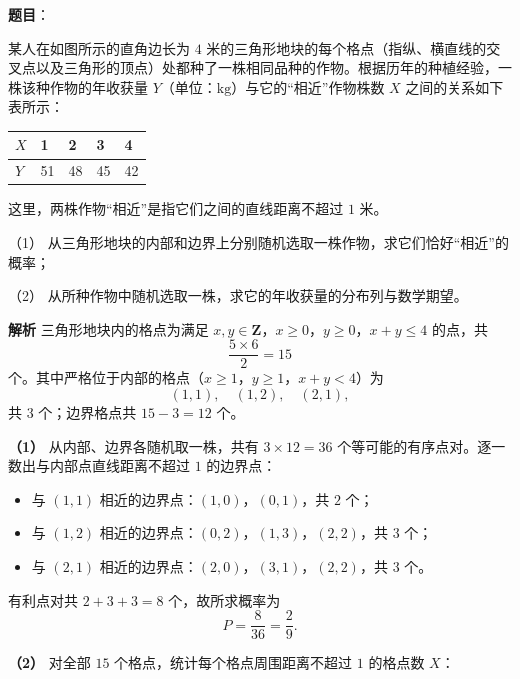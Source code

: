 \begin{answer}

\textbf{题目}：

某人在如图所示的直角边长为 $4$ 米的三角形地块的每个格点（指纵、横直线的交叉点以及三角形的顶点）处都种了一株相同品种的作物。根据历年的种植经验，一株该种作物的年收获量 $Y$（单位：$\mathrm{kg}$）与它的“相近”作物株数 $X$ 之间的关系如下表所示：

\begin{center}
\begin{tabular}{lllll}
\toprule
$X$ & 1 & 2 & 3 & 4 \\
\midrule
$Y$ & 51 & 48 & 45 & 42 \\
\bottomrule
\end{tabular}
\end{center}

这里，两株作物“相近”是指它们之间的直线距离不超过 $1$ 米。

（1） 从三角形地块的内部和边界上分别随机选取一株作物，求它们恰好“相近”的概率；

（2） 从所种作物中随机选取一株，求它的年收获量的分布列与数学期望。
\nopagebreak[4]
\begin{center}\end{center}
\nopagebreak[4]
\textbf{解析}
三角形地块内的格点为满足 $x,y\in\mathbf Z$，$x\geqslant0$，$y\geqslant0$，$x+y\leqslant4$ 的点，共
\nopagebreak[4]
\[\frac{5\times6}{2}=15\]
个。其中严格位于内部的格点（$x\geqslant1$，$y\geqslant1$，$x+y<4$）为
\nopagebreak[4]
\[(1,1),\quad(1,2),\quad(2,1),\]
共 $3$ 个；边界格点共 $15-3=12$ 个。

\textbf{（1）} 从内部、边界各随机取一株，共有 $3\times12=36$ 个等可能的有序点对。逐一数出与内部点直线距离不超过 $1$ 的边界点：

\begin{itemize}
\item 与 $(1,1)$ 相近的边界点：$(1,0)$，$(0,1)$，共 $2$ 个；
\item 与 $(1,2)$ 相近的边界点：$(0,2)$，$(1,3)$，$(2,2)$，共 $3$ 个；
\item 与 $(2,1)$ 相近的边界点：$(2,0)$，$(3,1)$，$(2,2)$，共 $3$ 个。
\end{itemize}

有利点对共 $2+3+3=8$ 个，故所求概率为
\nopagebreak[4]
\[P=\frac{8}{36}=\frac29.\]

\textbf{（2）} 对全部 $15$ 个格点，统计每个格点周围距离不超过 $1$ 的格点数 $X$：


\end{answer}
